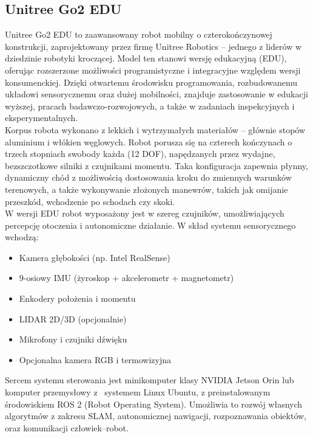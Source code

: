 \documentclass[12pt]{article}
\begin{document}
\subsection{Unitree Go2 EDU}

\noindent Unitree Go2 EDU to zaawansowany robot mobilny o czterokończynowej konstrukcji, zaprojektowany przez firmę Unitree Robotics – jednego z liderów w dziedzinie robotyki kroczącej. Model ten stanowi wersję edukacyjną (EDU), oferując rozszerzone możliwości programistyczne i integracyjne względem wersji konsumenckiej. Dzięki otwartemu środowisku programowania, rozbudowanemu układowi sensorycznemu oraz dużej mobilności, znajduje zastosowanie w edukacji wyższej, pracach badawczo-rozwojowych, a także w zadaniach inspekcyjnych i eksperymentalnych.\\

\noindent Korpus robota wykonano z lekkich i wytrzymałych materiałów – głównie stopów aluminium i włókien węglowych. Robot porusza się na czterech kończynach o trzech stopniach swobody każda (12 DOF), napędzanych przez wydajne, bezszczotkowe silniki z czujnikami momentu. Taka konfiguracja zapewnia płynny, dynamiczny chód z możliwością dostosowania kroku do zmiennych warunków terenowych, a także wykonywanie złożonych manewrów, takich jak omijanie przeszkód, wchodzenie po schodach czy skoki.\\

\noindent W wersji EDU robot wyposażony jest w szereg czujników, umożliwiających percepcję otoczenia i autonomiczne działanie. W skład systemu sensorycznego wchodzą:
\begin{itemize}
    \item Kamera głębokości (np. Intel RealSense)
    \item 9-osiowy IMU (żyroskop + akcelerometr + magnetometr)
    \item Enkodery położenia i momentu
    \item LIDAR 2D/3D (opcjonalnie)
    \item Mikrofony i czujniki dźwięku
    \item Opcjonalna kamera RGB i termowizyjna
\end{itemize}

\noindent Sercem systemu sterowania jest minikomputer klasy NVIDIA Jetson Orin lub komputer przemysłowy z~ systemem Linux Ubuntu, z preinstalowanym środowiskiem ROS 2 (Robot Operating System). Umożliwia to rozwój własnych algorytmów z zakresu SLAM, autonomicznej nawigacji, rozpoznawania obiektów, oraz komunikacji człowiek–robot.\\
\end{document}
